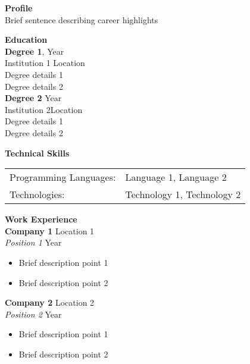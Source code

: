 \documentclass[a4paper]{article}
\newcommand{\header} [1] {
    {\hspace*{-18pt}\vspace*{6pt} {\color{CarnationPink}\large{\textbf{#1}}}}\\
}
\begin{document}
\header{Profile}
Brief sentence describing career highlights 
\vspace{2mm}

\header{Education}
\textbf{Degree 1},  \hfill Year\\
Institution 1 \hfill Location\\
Degree details 1\\
Degree details 2\\
\vspace{2mm}
\textbf{Degree 2} \hfill Year\\
Institution 2\hfill Location\\
Degree details 1\\
Degree details 2\\
\vspace{2mm}

\header{Technical Skills}
\hspace{-0.5em}\begin{tabular}{ l l }
	Programming Languages: & Language 1, Language 2\\
	Technologies: & Technology 1, Technology 2\\
\end{tabular}
\vspace{2mm}

\header{Work Experience}
\vspace{1mm}
\textbf{Company 1} \hfill Location 1\\
\textit{Position 1} \hfill Year\\
\vspace{-1mm}
\begin{itemize} \itemsep -2pt
    \item Brief description point 1
    \item Brief description point 2
\end{itemize}
\vspace{1mm}
\textbf{Company 2} \hfill Location 2\\
\textit{Position 2} \hfill Year\\
\vspace{-1mm}
\begin{itemize} \itemsep -2pt
    \item Brief description point 1
    \item Brief description point 2
\end{itemize}
\end{document}
